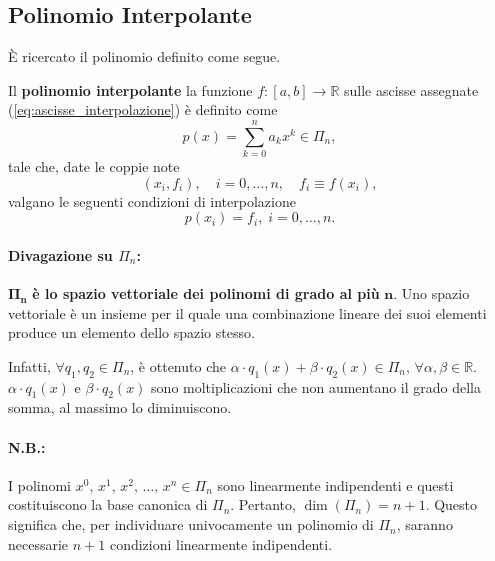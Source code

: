 \subsection{Polinomio Interpolante}
È ricercato il polinomio definito come segue.

\begin{definition}
	Il \textbf{polinomio interpolante} la funzione $f:[a,b]\rightarrow\mathbb{R}$ sulle ascisse assegnate (\ref{eq:ascisse_interpolazione}) è definito come
	\begin{equation}\label{eq:polinomio_interpolante_generico}
		p(x) = \sum_{k=0}^{n}a_kx^k \in\Pi_n,
	\end{equation}
	tale che, date le coppie note
	\begin{equation}\label{eq:coppie_xi,fi}
		(x_i,f_i),\quad i=0,\hdots,n, \quad f_i\equiv f(x_i),
	\end{equation}
	valgano le seguenti condizioni di interpolazione 
	\begin{equation}\label{eq:condizioni_interpolazione}
		p(x_i)=f_i,\; i=0,\hdots,n.
	\end{equation}
\end{definition}

\paragraph{Divagazione su $\Pi_n$:}	$\boldsymbol{\Pi_n}$ \textbf{è lo spazio vettoriale dei polinomi di grado al più} $\boldsymbol n$. Uno spazio vettoriale è un insieme per il quale una combinazione lineare dei suoi elementi produce un elemento dello spazio stesso.

\noindent Infatti, $\forall q_1, q_2\in\Pi_n$, è ottenuto che $\alpha \cdot q_1(x)+\beta\cdot q_2(x)\in\Pi_n,\, \forall \alpha,\beta\in\mathbb R$. $\alpha \cdot q_1(x)$ e $\beta\cdot q_2(x)$ sono moltiplicazioni che non aumentano il grado della somma, al massimo lo diminuiscono.

\paragraph{N.B.:} I polinomi $x^0,\, x^1,\, x^2,\, \hdots,\, x^n\in\Pi_n$ sono linearmente indipendenti e questi costituiscono la base canonica di $\Pi_n$. Pertanto, $\dim(\Pi_n)=n+1$. Questo significa che, per individuare univocamente un polinomio di $\Pi_n$,  saranno necessarie $n+1$ condizioni linearmente indipendenti.

